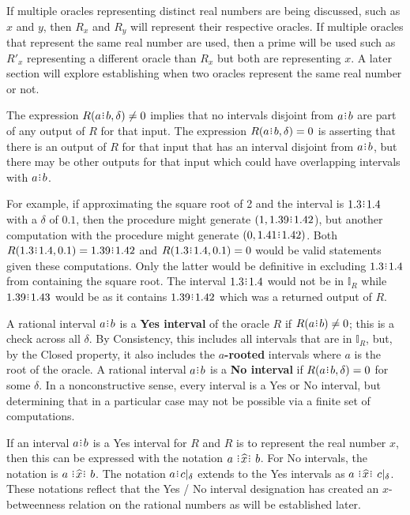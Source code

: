 \documentclass[12pt]{article}
\begin{document}
If multiple oracles representing distinct real numbers are being discussed, such as $x$ and $y$, then $R_x$ and $R_y$ will represent their respective oracles. If multiple oracles that represent the same real number are used, then a prime will be used such as $R'_x$ representing a different oracle than $R_x$ but both are representing $x$. A later section will explore establishing when two oracles represent the same real number or not. 

The expression $R(a\rint b, \delta) \neq 0$ implies that no intervals disjoint from $a\rint b$ are part of any output of $R$ for that input. The expression $R(a\rint b, \delta) = 0$ is asserting that there is an output of $R$ for that input that  has  an interval disjoint from $a \rint b$, but there may be other outputs for that input which could have overlapping intervals with $a \rint b$.

 For example, if approximating the square root of 2 and the interval is $1.3\rint 1.4$ with a $\delta$ of $0.1$, then the procedure might generate $(1, 1.39\rint 1.42$), but another computation with the procedure might generate $(0, 1.41\rint 1.42)$. Both $R(1.3\rint 1.4, 0.1) = 1.39\rint 1.42$ and $R(1.3\rint 1.4, 0.1) = 0$ would be valid statements given these computations. Only the latter would be definitive in excluding $1.3\rint 1.4$ from containing the square root. The interval $1.3\rint 1.4$ would not be in $\mathbb{I}_R$ while $1.39\rint 1.43$ would be as it contains $1.39\rint 1.42$ which was a returned output of $R$.

A rational interval $a\rint b$ is a \textbf{Yes interval} of the oracle $R$ if $R(a\rint b) \neq  0$; this is a check across all $\delta$. By Consistency, this includes all intervals that are in  $\mathbb{I}_R$, but, by the Closed property, it also includes the \textbf{$a$-rooted} intervals where $a$ is the root of the oracle.   A rational interval $a\rint b$ is a \textbf{No interval} if $R(a\rint b, \delta) = 0$ for some $\delta$. In a nonconstructive sense, every interval is a Yes or No interval, but determining that in a particular case may not be possible via a finite set of computations. 

If an interval $a\rint b$ is a Yes interval for $R$ and $R$ is to represent the real number $x$, then this can be expressed with the notation $a \xora b$. For No intervals, the notation is \sout{$a \xora b$}. The notation $a\rint c|_\delta$ extends to the Yes intervals as $a \xora c|_\delta$. These notations reflect that the Yes / No interval designation has created an $x$-betweenness relation on the rational numbers as will be established later.
\end{document}
